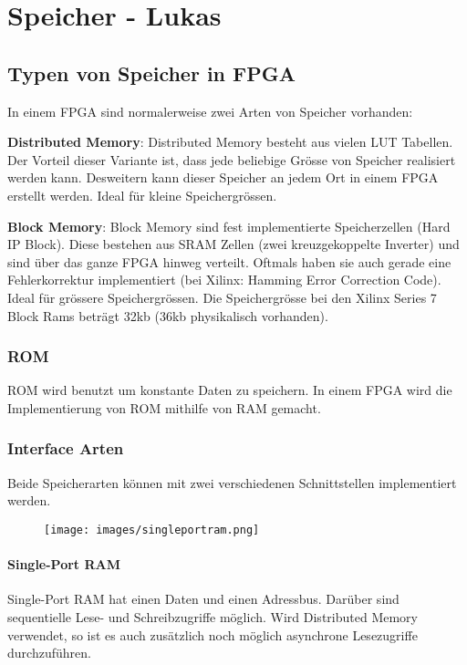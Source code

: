 \section{Speicher - Lukas}
\subsection{Typen von Speicher in FPGA}
In einem FPGA sind normalerweise zwei Arten von Speicher vorhanden:
\begin{compactitem}
    \item \textbf{Distributed Memory}: Distributed Memory besteht aus vielen LUT Tabellen. Der Vorteil dieser Variante ist, dass jede beliebige Grösse von Speicher realisiert werden kann. Desweitern kann dieser Speicher an jedem Ort in einem FPGA erstellt werden. Ideal für kleine Speichergrössen.
    \item \textbf{Block Memory}: Block Memory sind fest implementierte Speicherzellen (Hard IP Block). Diese bestehen aus SRAM Zellen (zwei kreuzgekoppelte Inverter) und sind über das ganze FPGA hinweg verteilt. Oftmals haben sie auch gerade eine Fehlerkorrektur implementiert (bei Xilinx: Hamming Error Correction Code). Ideal für grössere Speichergrössen. Die Speichergrösse bei den Xilinx Series 7 Block Rams beträgt 32kb (36kb physikalisch vorhanden).
\end{compactitem}

\subsubsection{ROM}
ROM wird benutzt um konstante Daten zu speichern. In einem FPGA wird die Implementierung von ROM mithilfe von RAM gemacht.

\subsubsection{Interface Arten}
Beide Speicherarten können mit zwei verschiedenen Schnittstellen implementiert werden.

\begin{minipage}{0.3\textwidth}
    \begin{figure}[H]
        \texttt{[image: images/singleportram.png]}
    \end{figure}
\end{minipage}
\hfill
\begin{minipage}{0.65\textwidth}
    \paragraph{Single-Port RAM}
    Single-Port RAM hat einen Daten und einen Adressbus. Darüber sind sequentielle Lese- und Schreibzugriffe möglich. Wird Distributed Memory verwendet, so ist es auch zusätzlich noch möglich asynchrone Lesezugriffe durchzuführen. \ \\ \ \\ \ \\
\end{minipage}

